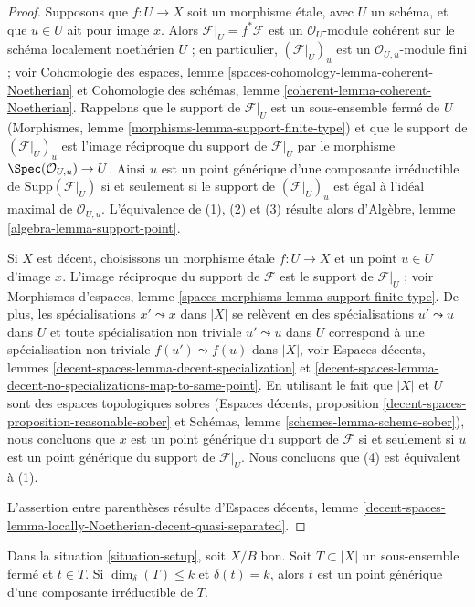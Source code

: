 \begin{proof}
Supposons que $f : U \to X$ soit un morphisme \'etale, avec $U$ un schéma, et
que $u \in U$ ait pour image $x$. Alors $\mathcal{F}|_U = f^*\mathcal{F}$ est
un $\mathcal{O}_U$-module cohérent sur le schéma localement noethérien $U$ ; en
particulier, $(\mathcal{F}|_U)_u$ est un $\mathcal{O}_{U, u}$-module fini ; voir
Cohomologie des espaces, lemme
\ref{spaces-cohomology-lemma-coherent-Noetherian} et Cohomologie des schémas,
lemme \ref{coherent-lemma-coherent-Noetherian}. Rappelons que le support de
$\mathcal{F}|_U$ est un sous-ensemble fermé de $U$ (Morphismes, lemme
\ref{morphisms-lemma-support-finite-type}) et que le support de
$(\mathcal{F}|_U)_u$ est l'image réciproque du support de $\mathcal{F}|_U$ par le
morphisme $\Spec(\mathcal{O}_{U, u}) \to U$. Ainsi $u$ est un point générique
d'une composante irréductible de $\text{Supp}(\mathcal{F}|_U)$ si et seulement
si le support de $(\mathcal{F}|_U)_u$ est égal à l'idéal maximal de
$\mathcal{O}_{U, u}$. L'équivalence de (1), (2) et (3) résulte alors d'Algèbre,
lemme \ref{algebra-lemma-support-point}.

\medskip\noindent
Si $X$ est décent, choisissons un morphisme \'etale $f : U \to X$ et un point
$u \in U$ d'image $x$. L'image réciproque du support de $\mathcal{F}$ est le
support de $\mathcal{F}|_U$ ; voir Morphismes d'espaces, lemme
\ref{spaces-morphisms-lemma-support-finite-type}. De plus, les spécialisations
$x' \leadsto x$ dans $|X|$ se relèvent en des spécialisations $u' \leadsto u$
dans $U$ et toute spécialisation non triviale $u' \leadsto u$ dans $U$
correspond à une spécialisation non triviale $f(u') \leadsto f(u)$ dans $|X|$,
voir Espaces décents, lemmes \ref{decent-spaces-lemma-decent-specialization}
et \ref{decent-spaces-lemma-decent-no-specializations-map-to-same-point}. En
utilisant le fait que $|X|$ et $U$ sont des espaces topologiques sobres
(Espaces décents, proposition \ref{decent-spaces-proposition-reasonable-sober}
et Schémas, lemme \ref{schemes-lemma-scheme-sober}), nous concluons que $x$
est un point générique du support de $\mathcal{F}$ si et seulement si $u$ est
un point générique du support de $\mathcal{F}|_U$. Nous concluons que (4) est
équivalent à (1).

\medskip\noindent
L'assertion entre parenthèses résulte d'Espaces décents, lemme
\ref{decent-spaces-lemma-locally-Noetherian-decent-quasi-separated}.
\end{proof}

\begin{lemma}
\label{lemma-point-of-max-dimension}
Dans la situation \ref{situation-setup}, soit $X/B$ bon. Soit $T
\subset |X|$ un sous-ensemble fermé et $t \in T$. Si $\dim_\delta(T) \leq k$
et $\delta(t) = k$, alors $t$ est un point générique d'une composante
irréductible de $T$.
\end{lemma}

